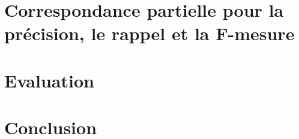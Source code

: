     \section{Correspondance partielle pour la précision, le rappel et la F-mesure}
    \label{sec:main-automatic_evaluation_of_keyphrase_annotation-contributions-evaluation-soft_maching_precision_recall_and_f_measure}

    \section{Evaluation}
    \label{sec:main-automatic_evaluation_of_keyphrase_annotation-contributions-evaluation-evaluation}

    \section{Conclusion}
    \label{sec:main-automatic_evaluation_of_keyphrase_annotation-contributions-evaluation-conclusion}

